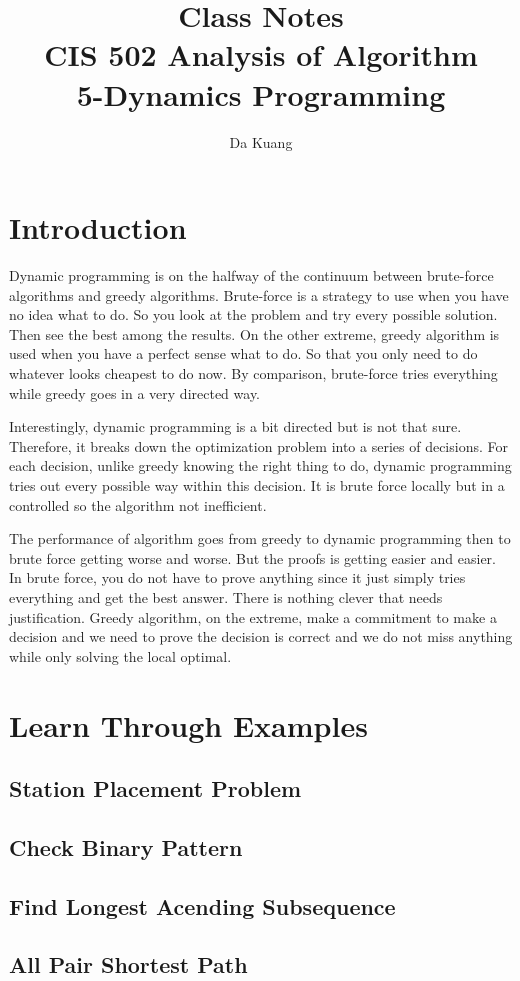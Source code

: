 \documentclass[en,hazy,blue,screen,14pt]{elegantnote}
\title{Class Notes\\CIS 502 Analysis of Algorithm\\5-Dynamics Programming}
\author{Da Kuang}
\institute{University of Pennsylvania}
\date{}
\begin{document}
\maketitle
\newpage
% 
\section{Introduction}
Dynamic programming is on the halfway of the continuum between brute-force algorithms and greedy algorithms. Brute-force is a strategy to use when you have no idea what to do. So you look at the problem and try every possible solution. Then see the best among the results. On the other extreme, greedy algorithm is used when you have a perfect sense what to do. So that you only need to do whatever looks cheapest to do now. By comparison, brute-force tries everything while greedy goes in a very directed way.

Interestingly, dynamic programming is a bit directed but is not that sure. Therefore, it breaks down the optimization problem into a series of decisions. For each decision, unlike greedy knowing the right thing to do, dynamic programming tries out every possible way within this decision. It is brute force locally but in a controlled so the algorithm not inefficient.

The performance of algorithm goes from greedy to dynamic programming then to brute force getting worse and worse. But the proofs is getting easier and easier. In brute force, you do not have to prove anything since it just simply tries everything and get the best answer. There is nothing clever that needs justification. Greedy algorithm, on the extreme, make a commitment to make a decision and we need to prove the decision is correct and we do not miss anything while only solving the local optimal.

\section{Learn Through Examples}
\subsection{Station Placement Problem}


\subsection{Check Binary Pattern}


\subsection{Find Longest Acending Subsequence}


\subsection{All Pair Shortest Path}

\end{document}
